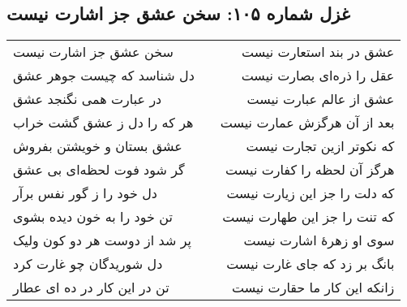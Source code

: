 \begin{center}
\section*{غزل شماره ۱۰۵: سخن عشق جز اشارت نیست}
\label{sec:105}
\begin{longtable}{l p{0.5cm} r}
سخن عشق جز اشارت نیست
&&
عشق در بند استعارت نیست
\\
دل شناسد که چیست جوهر عشق
&&
عقل را ذره‌ای بصارت نیست
\\
در عبارت همی نگنجد عشق
&&
عشق از عالم عبارت نیست
\\
هر که را دل ز عشق گشت خراب
&&
بعد از آن هرگزش عمارت نیست
\\
عشق بستان و خویشتن بفروش
&&
که نکوتر ازین تجارت نیست
\\
گر شود فوت لحظه‌ای بی عشق
&&
هرگز آن لحظه را کفارت نیست
\\
دل خود را ز گور نفس برآر
&&
که دلت را جز این زیارت نیست
\\
تن خود را به خون دیده بشوی
&&
که تنت را جز این طهارت نیست
\\
پر شد از دوست هر دو کون ولیک
&&
سوی او زهرهٔ اشارت نیست
\\
دل شوریدگان چو غارت کرد
&&
بانگ بر زد که جای غارت نیست
\\
تن در این کار در ده ای عطار
&&
زانکه این کار ما حقارت نیست
\\
\end{longtable}
\end{center}
